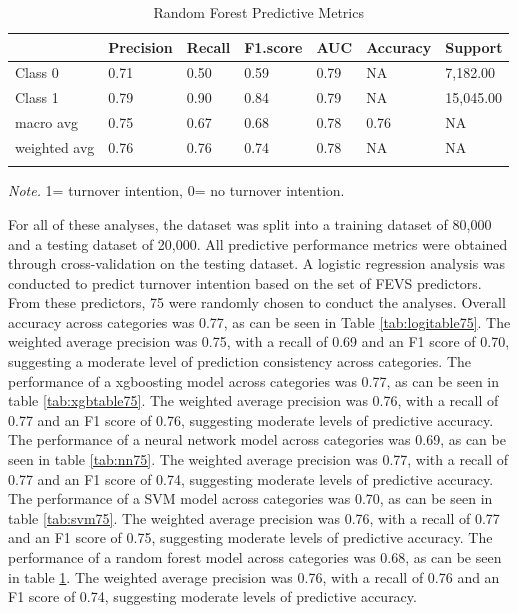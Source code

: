 \documentclass[
  man]{apa7}
\begin{document}
\begin{table}[tbp]

\begin{center}
\begin{threeparttable}

\caption{\label{tab:rf75}Random Forest Predictive Metrics}

\begin{tabular}{lllllll}
\toprule
 & \multicolumn{1}{c}{Precision} & \multicolumn{1}{c}{Recall} & \multicolumn{1}{c}{F1.score} & \multicolumn{1}{c}{AUC} & \multicolumn{1}{c}{Accuracy} & \multicolumn{1}{c}{Support}\\
\midrule
Class 0 & 0.71 & 0.50 & 0.59 & 0.79 & NA & 7,182.00\\
Class 1 & 0.79 & 0.90 & 0.84 & 0.79 & NA & 15,045.00\\
macro avg & 0.75 & 0.67 & 0.68 & 0.78 & 0.76 & NA\\
weighted avg & 0.76 & 0.76 & 0.74 & 0.78 & NA & NA\\
\bottomrule
\addlinespace
\end{tabular}

\begin{tablenotes}[para]
\normalsize{\textit{Note.} 1= turnover intention, 0= no turnover intention.}
\end{tablenotes}

\end{threeparttable}
\end{center}

\end{table}

For all of these analyses, the dataset was split into a training dataset of 80,000 and a testing dataset of 20,000. All predictive performance metrics were obtained through cross-validation on the testing dataset. A logistic regression analysis was conducted to predict turnover intention based on the set of FEVS predictors. From these predictors, 75 were randomly chosen to conduct the analyses. Overall accuracy across categories was 0.77, as can be seen in Table \ref{tab:logitable75}. The weighted average precision was 0.75, with a recall of 0.69 and an F1 score of 0.70, suggesting a moderate level of prediction consistency across categories.
The performance of a xgboosting model across categories was 0.77, as can be seen in table \ref{tab:xgbtable75}. The weighted average precision was 0.76, with a recall of 0.77 and an F1 score of 0.76, suggesting moderate levels of predictive accuracy.
The performance of a neural network model across categories was 0.69, as can be seen in table \ref{tab:nn75}. The weighted average precision was 0.77, with a recall of 0.77 and an F1 score of 0.74, suggesting moderate levels of predictive accuracy.
The performance of a SVM model across categories was 0.70, as can be seen in table \ref{tab:svm75}. The weighted average precision was 0.76, with a recall of 0.77 and an F1 score of 0.75, suggesting moderate levels of predictive accuracy.
The performance of a random forest model across categories was 0.68, as can be seen in table \ref{tab:rf75}. The weighted average precision was 0.76, with a recall of 0.76 and an F1 score of 0.74, suggesting moderate levels of predictive accuracy.
\end{document}
